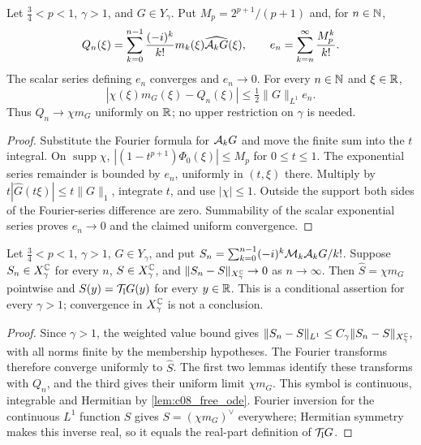 \begin{lemma}
  \label{lem:c08_low_fourier_series}
  Let $\frac34<p<1$, $\gamma>1$, and $G\in Y_\gamma$. Put $M_p=2^{p+1}/(p+1)$ and, for $n\in\mathbb{N}$,
  \[
    Q_n(\xi)=\sum_{k=0}^{n-1}\frac{(-i)^k}{k!}m_k(\xi)\widehat{\mathcal{A}_kG}(\xi),\qquad
    e_n=\sum_{k=n}^{\infty}\frac{M_p^k}{k!}.
  \]
  The scalar series defining $e_n$ converges and $e_n\to0$. For every $n\in\mathbb{N}$ and $\xi\in\mathbb{R}$,
  \[
    |\chi(\xi)m_G(\xi)-Q_n(\xi)|\le\tfrac12\|G\|_{L^1}e_n.
  \]
  Thus $Q_n\to\chi m_G$ uniformly on $\mathbb{R}$; no upper restriction on $\gamma$ is needed.
\end{lemma}
\begin{proof}
  Substitute the Fourier formula for $\mathcal{A}_kG$ and move the finite sum into the $t$ integral.
  On $\operatorname{supp}\chi$, $|(1-t^{p+1})\Phi_0(\xi)|\le M_p$ for $0\le t\le1$.
  The exponential series remainder is bounded by $e_n$, uniformly in $(t,\xi)$ there.
  Multiply by $t|\widehat G(t\xi)|\le t\|G\|_1$, integrate $t$, and use $|\chi|\le1$.
  Outside the support both sides of the Fourier-series difference are zero. Summability of the
  scalar exponential series proves $e_n\to0$ and the claimed uniform convergence.
\end{proof}

\begin{lemma}
  \label{lem:c08_low_series_identification}
  Let $\frac34<p<1$, $\gamma>1$, $G\in Y_\gamma$, and put
  $S_n=\sum_{k=0}^{n-1}(-i)^k\mathcal{M}_k\mathcal{A}_kG/k!$.
  Suppose $S_n\in X^{\mathbb{C}}_\gamma$ for every $n$, $S\in X^{\mathbb{C}}_\gamma$, and
  $\|S_n-S\|_{X^{\mathbb{C}}_\gamma}\to0$ as $n\to\infty$.
  Then $\widehat S=\chi m_G$ pointwise and $S(y)=\mathcal{T}_{\rm l}G(y)$ for every $y\in\mathbb{R}$.
  This is a conditional assertion for every $\gamma>1$; convergence in $X^{\mathbb{C}}_\gamma$ is not a conclusion.
\end{lemma}
\begin{proof}
  Since $\gamma>1$, the weighted value bound gives
  $\|S_n-S\|_{L^1}\le C_\gamma\|S_n-S\|_{X^{\mathbb{C}}_\gamma}$, with all norms finite by the membership hypotheses.
  The Fourier transforms therefore converge uniformly to $\widehat S$.
  The first two lemmas identify these transforms with $Q_n$, and the third gives their uniform
  limit $\chi m_G$. This symbol is continuous, integrable and Hermitian by \cref{lem:c08_free_ode}.
  Fourier inversion for the continuous $L^1$ function $S$ gives $S=(\chi m_G)^\vee$ everywhere;
  Hermitian symmetry makes this inverse real, so it equals the real-part definition of $\mathcal{T}_{\rm l}G$.
\end{proof}

